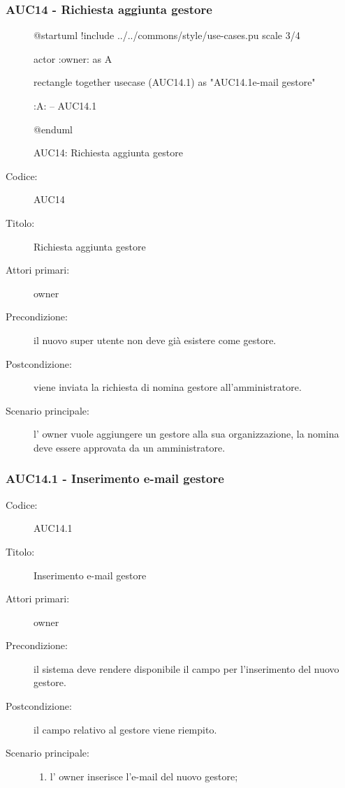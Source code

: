 \documentclass[casi-duso]{subfiles}
\begin{document}
\subsubsection{AUC14 - Richiesta aggiunta gestore}%
\label{subsub:AUC14}

\begin{figure}[h!]
  \centering
  \begin{plantuml}
  @startuml
  !include ../../commons/style/use-cases.pu
  scale 3/4

  actor :owner: as A

  rectangle {
    together {
      usecase (AUC14.1) as "AUC14.1\nInserimento e-mail gestore"
    }
  }

  :A: -- AUC14.1

  @enduml
  \end{plantuml}
  \caption{AUC14: Richiesta aggiunta gestore}
  \label{fig:auc14}
\end{figure}

\begin{description}
  \item[Codice:] AUC14
  \item[Titolo:] Richiesta aggiunta gestore
  \item[Attori primari:] owner
  \item[Precondizione:] il nuovo super utente non deve già esistere come gestore.
  \item[Postcondizione:] viene inviata la richiesta di nomina gestore all'amministratore.
  \item[Scenario principale:] l' owner vuole aggiungere un gestore alla sua organizzazione, la nomina deve essere approvata da un
  amministratore.
\end{description}

\subsubsection{AUC14.1 - Inserimento e-mail gestore}%
\label{subsub:AUC14.1}
\begin{description}
  \item[Codice:] AUC14.1
  \item[Titolo:] Inserimento e-mail gestore
  \item[Attori primari:] owner
  \item[Precondizione:] il sistema deve rendere disponibile il campo per l'inserimento del nuovo gestore.
  \item[Postcondizione:] il campo relativo al gestore viene riempito.
  \item[Scenario principale:]
  \begin{enumerate}
    \item l' owner inserisce l'e-mail del nuovo gestore;
  \end{enumerate}
\end{description}

\end{document}
